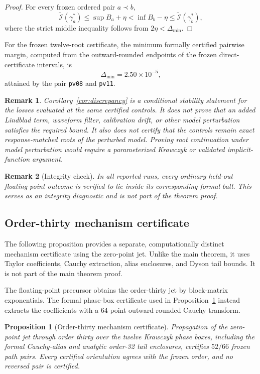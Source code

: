 \documentclass[11pt]{article}
\newtheorem{proposition}{Proposition}
\newtheorem{remark}{Remark}
\begin{document}
\begin{proof}
For every frozen ordered pair $a\prec b$,
\[
\widetilde{\mathcal I}(\gamma_a^\ast)
\le \sup B_a+\eta
<
\inf B_b-\eta
\le
\widetilde{\mathcal I}(\gamma_b^\ast),
\]
where the strict middle inequality follows from
$2\eta<\Delta_{\min}$.
\end{proof}

For the frozen twelve-root certificate, the minimum formally certified
pairwise margin, computed from the outward-rounded endpoints of the frozen
direct-certificate intervals, is
\[
\Delta_{\min}=2.50\times10^{-5},
\]
attained by the pair \texttt{pv08} and \texttt{pv11}.

\begin{remark}
Corollary~\ref{cor:discrepancy} is a conditional stability statement for the
losses evaluated at the same certified controls. It does not prove that an
added Lindblad term, waveform filter, calibration drift, or other model
perturbation satisfies the required bound. It also does not certify that the
controls remain exact response-matched roots of the perturbed model. Proving
root continuation under model perturbation would require a parameterized
Krawczyk or validated implicit-function argument.
\end{remark}

\begin{remark}[Integrity check]
In all reported runs, every ordinary held-out floating-point outcome is verified to lie inside its corresponding formal ball. This serves as an integrity diagnostic and is not part of the theorem proof.
\end{remark}

\subsection{Order-thirty mechanism certificate}

The following proposition provides a separate, computationally distinct mechanism certificate using the zero-point jet. Unlike the main theorem, it uses Taylor coefficients, Cauchy extraction, alias enclosures, and Dyson tail bounds. It is not part of the main theorem proof.

The floating-point precursor obtains the order-thirty jet by block-matrix exponentials. The formal phase-box certificate used in Proposition~\ref{prop:order30} instead extracts the coefficients with a 64-point outward-rounded Cauchy transform.

\begin{proposition}[Order-thirty mechanism certificate]
\label{prop:order30}
Propagation of the zero-point jet through order thirty over the twelve Krawczyk phase boxes, including the formal Cauchy-alias and analytic order-32 tail enclosures, certifies $52/66$ frozen path pairs. Every certified orientation agrees with the frozen order, and no reversed pair is certified.
\end{proposition}
\end{document}
